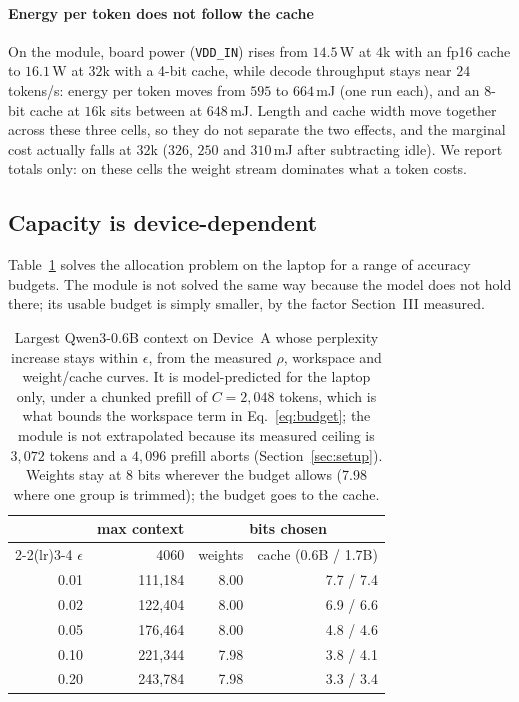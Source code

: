 \documentclass[10pt,journal]{IEEEtran}
\newcommand{\rhoSym}{\rho}
\begin{document}
\paragraph*{Energy per token does not follow the cache}
On the module, board power (\texttt{VDD\_IN}) rises from $14.5$\,W at $4$k with
an fp16 cache to $16.1$\,W at $32$k with a 4-bit cache, while decode throughput
stays near $24$ tokens/s: energy per token moves from $595$ to $664$\,mJ (one
run each), and an $8$-bit cache at $16$k sits between at $648$\,mJ. Length and
cache width move together across these three cells, so they do not separate the
two effects, and the marginal cost actually falls at $32$k ($326$, $250$ and
$310$\,mJ after subtracting idle). We report totals only: on these cells the
weight stream dominates what a token costs.

\subsection{Capacity is device-dependent}
\label{sec:results-capacity}

Table~\ref{tab:capacity} solves the allocation problem on the laptop for a
range of accuracy budgets. The module is not solved the same way because the
model does not hold there; its usable budget is simply smaller, by the factor
Section~III measured.

\begin{table}[t]
\centering
\caption{Largest Qwen3-0.6B context on Device~A whose perplexity increase
stays within $\epsilon$, from the measured $\rhoSym$, workspace and
weight/cache curves. It is model-predicted for the laptop only, under a
chunked prefill of $C=2{,}048$ tokens, which is what bounds the workspace term
in Eq.~\eqref{eq:budget}; the module is not extrapolated because its measured ceiling
is $3{,}072$ tokens and a $4{,}096$ prefill aborts (Section~\ref{sec:setup}).
Weights stay at 8 bits wherever the budget allows (7.98 where one group is
trimmed); the budget goes to the cache.}
\label{tab:capacity}
\begin{tabular}{rrrr}
\toprule
& max context & \multicolumn{2}{c}{bits chosen} \\
\cmidrule(lr){2-2}\cmidrule(lr){3-4}
$\epsilon$ & 4060 & weights & cache (0.6B / 1.7B) \\
\midrule
0.01 & 111{,}184 & 8.00 & 7.7 / 7.4 \\
0.02 & 122{,}404 & 8.00 & 6.9 / 6.6 \\
0.05 & 176{,}464 & 8.00 & 4.8 / 4.6 \\
0.10 & 221{,}344 & 7.98 & 3.8 / 4.1 \\
0.20 & 243{,}784 & 7.98 & 3.3 / 3.4 \\
\bottomrule
\end{tabular}
\end{table}
\end{document}
